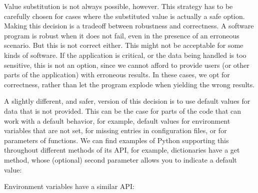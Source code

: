 \documentclass[a4paper,10pt,english]{sphinxmanual}
\begin{document}
Value substitution is not always possible, however. This strategy has to be carefully chosen for cases where
the substituted value is actually a safe option. Making this decision is a trade\sphinxhyphen{}off between robustness and
correctness. A software program is robust when it does not fail, even in the presence of an erroneous
scenario. But this is not correct either. This might not be acceptable for some kinds of software. If the
application is critical, or the data being handled is too sensitive, this is not an option, since we cannot
afford to provide users (or other parts of the application) with erroneous results. In these cases, we opt
for correctness, rather than let the program explode when yielding the wrong results.

A slightly different, and safer, version of this decision is to use default values for data that is not
provided. This can be the case for parts of the code that can work with a default behavior, for example,
default values for environment variables that are not set, for missing entries in configuration files, or for
parameters of functions. We can find examples of Python supporting this throughout different methods of its
API, for example, dictionaries have a get method, whose (optional) second parameter allows you to indicate a
default value:

\begin{sphinxVerbatim}[commandchars=\\\{\}]
   
 
\end{sphinxVerbatim}

Environment variables have a similar API:

\begin{sphinxVerbatim}[commandchars=\\\{\}]
 
 
\end{sphinxVerbatim}
\end{document}
